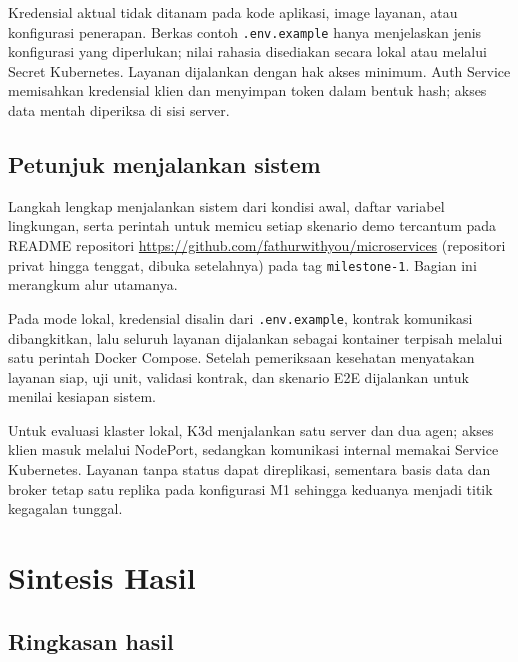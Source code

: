 \documentclass{fairmeta}
\begin{document}
Kredensial aktual tidak ditanam pada kode aplikasi, image layanan, atau konfigurasi penerapan. Berkas contoh \texttt{.env.example} hanya menjelaskan jenis konfigurasi yang diperlukan; nilai rahasia disediakan secara lokal atau melalui Secret Kubernetes. Layanan dijalankan dengan hak akses minimum. Auth Service memisahkan kredensial klien dan menyimpan token dalam bentuk hash; akses data mentah diperiksa di sisi server.

\subsection{Petunjuk menjalankan sistem}

Langkah lengkap menjalankan sistem dari kondisi awal, daftar variabel lingkungan, serta perintah untuk memicu setiap skenario demo tercantum pada README repositori \url{https://github.com/fathurwithyou/microservices} (repositori privat hingga tenggat, dibuka setelahnya) pada tag \texttt{milestone-1}. Bagian ini merangkum alur utamanya.

Pada mode lokal, kredensial disalin dari \texttt{.env.example}, kontrak komunikasi dibangkitkan, lalu seluruh layanan dijalankan sebagai kontainer terpisah melalui satu perintah Docker Compose. Setelah pemeriksaan kesehatan menyatakan layanan siap, uji unit, validasi kontrak, dan skenario E2E dijalankan untuk menilai kesiapan sistem.

Untuk evaluasi klaster lokal, K3d menjalankan satu server dan dua agen; akses klien masuk melalui NodePort, sedangkan komunikasi internal memakai Service Kubernetes. Layanan tanpa status dapat direplikasi, sementara basis data dan broker tetap satu replika pada konfigurasi M1 sehingga keduanya menjadi titik kegagalan tunggal.

\section{Sintesis Hasil}

\subsection{Ringkasan hasil}
\end{document}
